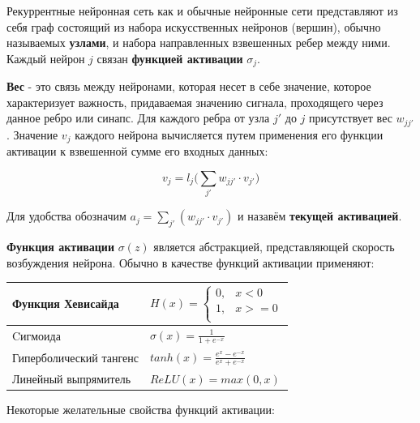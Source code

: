 \documentclass[a4paper,12pt]{article}
\begin{document}
	Рекуррентные нейронная сеть как и обычные нейронные сети представляют из себя граф состоящий из набора искусственных нейронов (вершин), обычно называемых \textbf{узлами}, и набора направленных взвешенных ребер между ними. Каждый нейрон $j$ связан \textbf{функцией активации} $\sigma_j$.
	
	\textbf{Вес} - это связь между нейронами, которая несет в себе значение, которое характеризует важность, придаваемая значению сигнала, проходящего через данное ребро или синапс. Для каждого ребра от узла $j'$ до $j$ присутствует вес $w_{jj'}$. Значение $v_j$ каждого нейрона вычисляется путем применения его функции активации к взвешенной сумме его входных данных: 
	
	$$v_j = l_j\bigg(\sum_{j'} w_{jj'} \cdot v_{j'}\bigg)$$
	
	Для удобства обозначим $a_j = \sum_{j'} (w_{jj'} \cdot v_{j'})$ и назавём \textbf{текущей активацией}. 
	
	\textbf{Функция активации} $\sigma(z)$ является абстракцией, представляющей скорость возбуждения нейрона. Обычно в качестве функций активации применяют:
	
	\begin{table}[h]
		\centering
		\begin{tabular}{|l|l|} 
			\hline
			Функция Хевисайда       &   
			$ H(x) = 
			\begin{cases}
				0, & x < 0 \\
				1, & x >= 0 \\
			\end{cases}$ \\ 
			\hline
			Cигмоида                &  $\sigma(x) = \frac{1}{1 + e^{-x}}$ \\ 
			\hline
			Гиперболический тангенс &  $tanh(x) = \frac{e^x - e^{-x}}{e^x + e^{-x}}$ \\ 
			\hline
			Линейный выпрямитель    &  $ReLU(x) = max(0, x)$ \\
			\hline
		\end{tabular}
	\end{table}

	\clearpage
	
	Некоторые желательные свойства функций активации:
	
\end{document}
